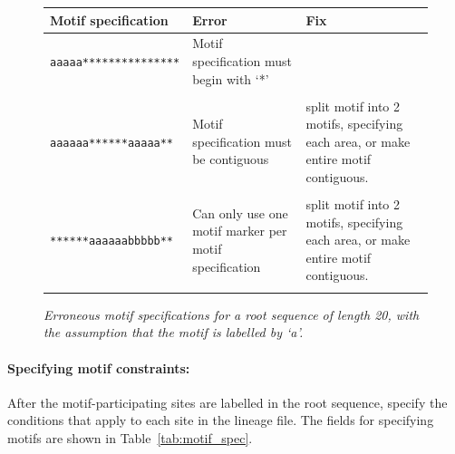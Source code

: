 \documentclass[10pt]{article}
\begin{document}
 \begin{figure}[htbp]
  \begin{tabular}{lp{2.5in}p{2.5in}}
   \hline\hline
   Motif specification & Error & Fix\\
   \hline
   {\tt aaaaa***************} & Motif specification must begin with `*'\\\\
   {\tt *aaaaaa******aaaaa**} & Motif specification must be contiguous & split motif into 2 motifs, specifying each area, or make entire motif contiguous.\\\\
   {\tt *******aaaaaabbbbb**} & Can only use one motif marker per motif specification & split motif into 2 motifs, specifying each area, or make entire motif contiguous.\\\\
   \hline
  \end{tabular}
  \caption{\textit{Erroneous motif specifications for a root sequence of length 20, with the assumption that the motif is labelled by `a'.}}
  \label{fig:motif_errors}
 \end{figure}

  \paragraph{Specifying motif constraints:} After the motif-participating sites are labelled in the root sequence, specify the conditions that apply to each site in the lineage file. The fields for specifying motifs are shown in Table~\ref{tab:motif_spec}.
\end{document}
